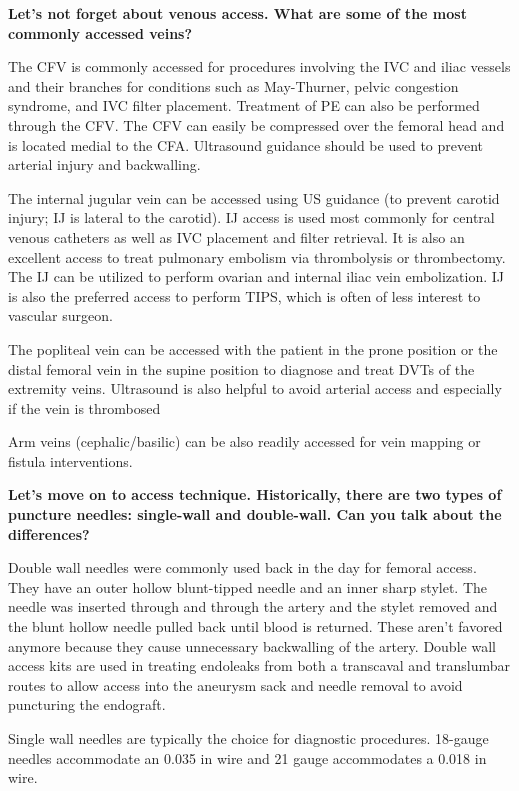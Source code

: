\documentclass[
]{book}
\begin{document}
\textbf{Let's not forget about venous access. What are some of the most
commonly accessed veins?}

The CFV is commonly accessed for procedures involving the IVC and iliac
vessels and their branches for conditions such as May-Thurner, pelvic
congestion syndrome, and IVC filter placement. Treatment of PE can also
be performed through the CFV. The CFV can easily be compressed over the
femoral head and is located medial to the CFA. Ultrasound guidance
should be used to prevent arterial injury and backwalling.

The internal jugular vein can be accessed using US guidance (to prevent
carotid injury; IJ is lateral to the carotid). IJ access is used most
commonly for central venous catheters as well as IVC placement and
filter retrieval. It is also an excellent access to treat pulmonary
embolism via thrombolysis or thrombectomy. The IJ can be utilized to
perform ovarian and internal iliac vein embolization. IJ is also the
preferred access to perform TIPS, which is often of less interest to
vascular surgeon.

The popliteal vein can be accessed with the patient in the prone
position or the distal femoral vein in the supine position to diagnose
and treat DVTs of the extremity veins. Ultrasound is also helpful to
avoid arterial access and especially if the vein is thrombosed

Arm veins (cephalic/basilic) can be also readily accessed for vein
mapping or fistula interventions.

\textbf{Let's move on to access technique. Historically, there are two types
of puncture needles: single-wall and double-wall. Can you talk about the
differences?}

Double wall needles were commonly used back in the day for femoral
access. They have an outer hollow blunt-tipped needle and an inner sharp
stylet. The needle was inserted through and through the artery and the
stylet removed and the blunt hollow needle pulled back until blood is
returned. These aren't favored anymore because they cause unnecessary
backwalling of the artery. Double wall access kits are used in treating
endoleaks from both a transcaval and translumbar routes to allow access
into the aneurysm sack and needle removal to avoid puncturing the
endograft.

Single wall needles are typically the choice for diagnostic procedures.
18-gauge needles accommodate an 0.035 in wire and 21 gauge accommodates
a 0.018 in wire.
\end{document}
